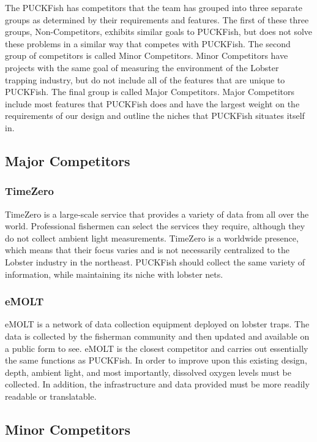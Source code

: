 \documentclass[12pt]{article}         %
\begin{document}
\par The PUCKFish has competitors that the team has grouped into three separate groups as determined by their requirements and features. The first of these three groups, Non-Competitors, exhibits similar goals to PUCKFish, but does not solve these problems in a similar way that competes with PUCKFish. The second group of competitors is called Minor Competitors. Minor Competitors have projects with the same goal of measuring the environment of the Lobster trapping industry, but do not include all of the features that are unique to PUCKFish. The final group is called Major Competitors. Major Competitors include most features that PUCKFish does and have the largest weight on the requirements of our design and outline the niches that PUCKFish situates itself in.

\subsection{Major Competitors}
\subsubsection{TimeZero}
\par TimeZero is a large-scale service that provides a variety of data from all over the world.  Professional fishermen can select the services they require, although they do not collect ambient light measurements. TimeZero is a worldwide presence, which means that their focus varies and is not necessarily centralized to the Lobster industry in the northeast. PUCKFish should collect the same variety of information, while maintaining its niche with lobster nets.

\subsubsection{eMOLT}
\par eMOLT is a network of data collection equipment deployed on lobster traps. The data is collected by the fisherman community and then updated and available on a public form to see. eMOLT is the closest competitor and carries out essentially the same functions as PUCKFish. In order to improve upon this existing design, depth, ambient light, and most importantly, dissolved oxygen levels must be collected. In addition, the infrastructure and data provided must be more readily readable or translatable.

\subsection{Minor Competitors}
\end{document}
